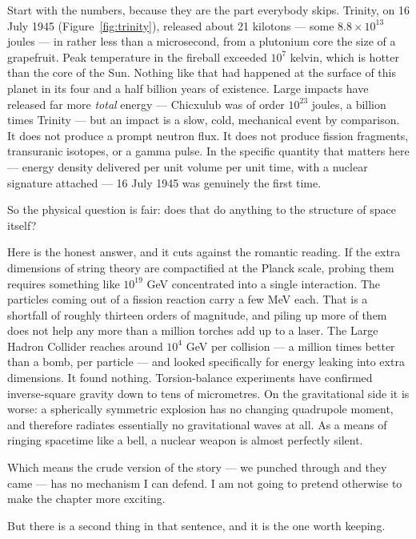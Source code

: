 Start with the numbers, because they are the part everybody skips. Trinity, on 16 July 1945
(Figure~\ref{fig:trinity}), released about 21 kilotons --- some $8.8 \times 10^{13}$ joules --- in
rather less than a microsecond, from a plutonium core the size of a grapefruit. Peak temperature in
the fireball exceeded $10^{7}$ kelvin, which is hotter than the core of the Sun. Nothing like that
had happened at the surface of this planet in its four and a half billion years of existence. Large
impacts have released far more \emph{total} energy --- Chicxulub was of order $10^{23}$ joules, a
billion times Trinity --- but an impact is a slow, cold, mechanical event by comparison. It does not
produce a prompt neutron flux. It does not produce fission fragments, transuranic isotopes, or a
gamma pulse. In the specific quantity that matters here --- energy density delivered per unit volume
per unit time, with a nuclear signature attached --- 16 July 1945 was genuinely the first time.

So the physical question is fair: does that do anything to the structure of space itself?

Here is the honest answer, and it cuts against the romantic reading.  If the
extra dimensions of string theory are compactified at the Planck scale, probing them requires
something like $10^{19}$ GeV concentrated into a single interaction. The particles coming out of a
fission reaction carry a few MeV each. That is a shortfall of roughly thirteen orders of magnitude,
and piling up more of them does not help any more than a million torches add up to a laser. The
Large Hadron Collider reaches around $10^{4}$ GeV per collision --- a million times better than a
bomb, per particle --- and looked specifically for energy leaking into extra dimensions. It found
nothing. Torsion-balance experiments have confirmed inverse-square gravity down to tens of
micrometres. On the gravitational side it is worse: a spherically symmetric explosion has no
changing quadrupole moment, and therefore radiates essentially no gravitational waves at all. As a
means of ringing spacetime like a bell, a nuclear weapon is almost perfectly silent.

Which means the crude version of the story --- we punched through and they came --- has no mechanism
I can defend. I am not going to pretend otherwise to make the chapter more exciting.

But there is a second thing in that sentence, and it is the one worth keeping.

